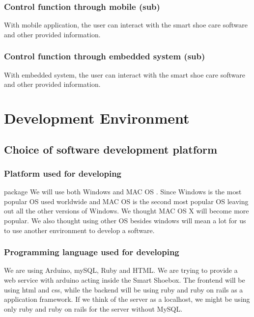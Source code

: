 \documentclass[conference]{IEEEtran}
\begin{document}
\subsubsection{Control function through mobile (sub)}
With mobile application, the user can interact with the smart shoe care software and other provided information.
\subsubsection{Control function through embedded system (sub)}
With embedded system, the user can interact with the smart shoe care software and other provided information.

\section{Development Environment}

\subsection{Choice of software development platform}
\subsubsection{Platform used for developing}package
 We will use both Windows and MAC OS . Since Windows is the most popular OS used worldwide and MAC OS is the second most popular OS leaving out all the other versions of Windows. We thought MAC OS X will become more popular. We also thought using other OS besides windows will mean a lot for us to use another environment to develop a software.
\\
\subsubsection{Programming language used for developing}
We are using Arduino, mySQL, Ruby and HTML. We are trying to provide a web service with arduino acting inside the Smart Shoebox. The frontend will be using html and css, while the backend will be using ruby and ruby on rails as a application framework. If we think of the server as a localhost, we might be using only ruby and ruby on rails for the server without MySQL.\\
\end{document}
